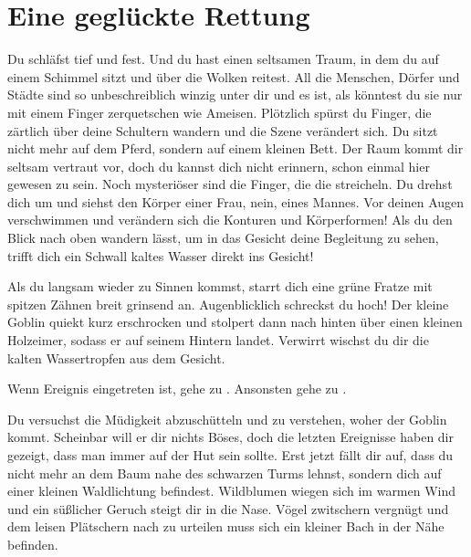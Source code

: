 \chapter*{Eine geglückte Rettung}


Du schläfst tief und fest.
Und du hast einen seltsamen Traum, in dem du auf einem Schimmel sitzt und über die Wolken reitest.
All die Menschen, Dörfer und Städte sind so unbeschreiblich winzig unter dir und es ist, als könntest du sie nur mit einem Finger zerquetschen wie Ameisen.
Plötzlich spürst du Finger, die zärtlich über deine Schultern wandern und die Szene verändert sich. Du sitzt nicht mehr auf dem Pferd, sondern auf einem kleinen Bett. Der Raum kommt dir seltsam vertraut vor, doch du kannst dich nicht erinnern, schon einmal hier gewesen zu sein.
Noch mysteriöser sind die Finger, die die streicheln.
Du drehst dich um und siehst den Körper einer Frau, nein, eines Mannes.
Vor deinen Augen verschwimmen und verändern sich die Konturen und Körperformen!
Als du den Blick nach oben wandern lässt, um in das Gesicht deine Begleitung zu sehen, trifft dich ein Schwall kaltes Wasser direkt ins Gesicht!

Als du langsam wieder zu Sinnen kommst, starrt dich eine grüne Fratze mit spitzen Zähnen breit grinsend an. %
Augenblicklich schreckst du hoch!
Der kleine Goblin quiekt kurz erschrocken und stolpert dann nach hinten über einen kleinen Holzeimer, sodass er auf seinem Hintern landet. Verwirrt wischst du dir die kalten Wassertropfen aus dem Gesicht.

Wenn Ereignis  eingetreten ist, gehe zu .
Ansonsten gehe zu .


Du versuchst die Müdigkeit abzuschütteln und zu verstehen, woher der Goblin kommt.
Scheinbar will er dir nichts Böses, doch die letzten Ereignisse haben dir gezeigt, dass man immer auf der Hut sein sollte.
Erst jetzt fällt dir auf, dass du nicht mehr an dem Baum nahe des schwarzen Turms lehnst, sondern dich auf einer kleinen Waldlichtung befindest.
Wildblumen wiegen sich im warmen Wind und ein süßlicher Geruch steigt dir in die Nase. Vögel zwitschern vergnügt und dem leisen Plätschern nach zu urteilen muss sich ein kleiner Bach in der Nähe befinden.

